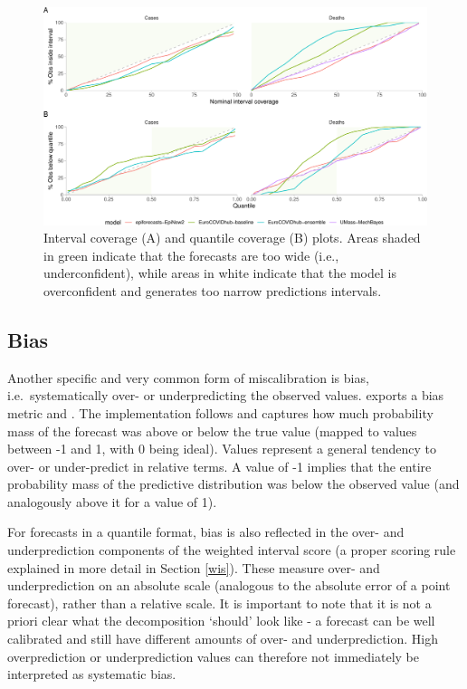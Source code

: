\documentclass[
]{jss}
\begin{document}
\begin{CodeChunk}
\begin{figure}[!h]

{\centering \includegraphics[width=1\linewidth]{manuscript_files/figure-latex/coverage-1} 

}

\caption[Interval coverage (A) and quantile coverage (B) plots]{Interval coverage (A) and quantile coverage (B) plots. Areas shaded in green indicate that the forecasts are too wide (i.e., underconfident), while areas in white indicate that the model is overconfident and generates too narrow predictions intervals.}\label{fig:coverage}
\end{figure}
\end{CodeChunk}

\subsection{Bias}\label{bias}

Another specific and very common form of miscalibration is bias,
i.e.~systematically over- or underpredicting the observed values.
 exports a bias metric  and
. The implementation follows
\cite{funkAssessingPerformanceRealtime2019} and captures how much
probability mass of the forecast was above or below the true value
(mapped to values between -1 and 1, with 0 being ideal). Values
represent a general tendency to over- or under-predict in relative
terms. A value of -1 implies that the entire probability mass of the
predictive distribution was below the observed value (and analogously
above it for a value of 1).

For forecasts in a quantile format, bias is also reflected in the over-
and underprediction components of the weighted interval score (a proper
scoring rule explained in more detail in Section \ref{wis}). These
measure over- and underprediction on an absolute scale (analogous to the
absolute error of a point forecast), rather than a relative scale. It is
important to note that it is not a priori clear what the decomposition
`should' look like - a forecast can be well calibrated and still have
different amounts of over- and underprediction. High overprediction or
underprediction values can therefore not immediately be interpreted as
systematic bias.
\end{document}
